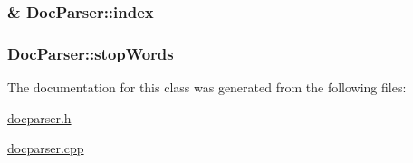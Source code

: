 \subsubsection[{index}]{\& Doc\+Parser\+::index\hspace{0.3cm}{\ttfamily [private]}}\label{class_doc_parser_ad0e840d5c92edbe2c8f28406a5c3f008}
\hypertarget{class_doc_parser_a089705924f6a28afb59064526b4b7f4f}{}
\subsubsection[{stop\+Words}]{ Doc\+Parser\+::stop\+Words\hspace{0.3cm}{\ttfamily [private]}}\label{class_doc_parser_a089705924f6a28afb59064526b4b7f4f}


The documentation for this class was generated from the following files\+:\begin{DoxyCompactItemize}
\item 
\hyperlink{docparser_8h}{docparser.\+h}\item 
\hyperlink{docparser_8cpp}{docparser.\+cpp}\end{DoxyCompactItemize}
